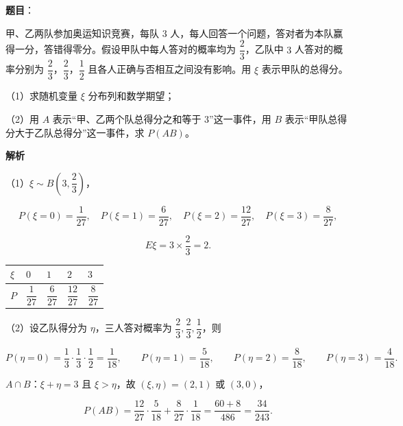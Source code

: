 \begin{answer}

\textbf{题目}：

甲、乙两队参加奥运知识竞赛，每队 $3$ 人，每人回答一个问题，答对者为本队赢得一分，答错得零分。假设甲队中每人答对的概率均为 $\dfrac23$，乙队中 $3$ 人答对的概率分别为 $\dfrac23$，$\dfrac23$，$\dfrac12$ 且各人正确与否相互之间没有影响。用 $\xi$ 表示甲队的总得分。

（1）求随机变量 $\xi$ 分布列和数学期望；

（2）用 $A$ 表示“甲、乙两个队总得分之和等于 $3$”这一事件，用 $B$ 表示“甲队总得分大于乙队总得分”这一事件，求 $P(AB)$。

\textbf{解析}

（1）$\xi\sim B\left(3,\dfrac23\right)$，

\nopagebreak[4]
\[P(\xi=0)=\frac1{27},\quad P(\xi=1)=\frac6{27},\quad P(\xi=2)=\frac{12}{27},\quad P(\xi=3)=\frac8{27},\]

\nopagebreak[4]
\[E\xi=3\times\frac23=2.\]

\begin{center}
\begin{tabular}{lllll}
\toprule
$\xi$ & $0$ & $1$ & $2$ & $3$ \\
\midrule
$P$ & $\dfrac1{27}$ & $\dfrac6{27}$ & $\dfrac{12}{27}$ & $\dfrac8{27}$ \\
\bottomrule
\end{tabular}
\end{center}

（2）设乙队得分为 $\eta$，三人答对概率为 $\dfrac23,\dfrac23,\dfrac12$，则

\nopagebreak[4]
\[P(\eta=0)=\frac13\cdot\frac13\cdot\frac12=\frac1{18},\qquad P(\eta=1)=\frac5{18},\qquad P(\eta=2)=\frac8{18},\qquad P(\eta=3)=\frac4{18}.\]

$A\cap B$：$\xi+\eta=3$ 且 $\xi>\eta$，故 $(\xi,\eta)=(2,1)$ 或 $(3,0)$，

\nopagebreak[4]
\[P(AB)=\frac{12}{27}\cdot\frac5{18}+\frac8{27}\cdot\frac1{18}=\frac{60+8}{486}=\frac{34}{243}.\]


\end{answer}

